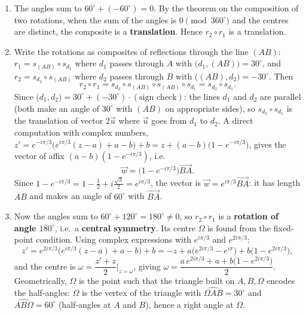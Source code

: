 \documentclass[11pt]{article}
\begin{document}
\begin{corrige}
\begin{enumerate}
\item The angles sum to $60^{\circ} + (-60^{\circ}) = 0$. By the theorem on the composition of two rotations, when the sum of the angles is $0 \pmod{360^{\circ}}$ and the centres are distinct, the composite is a \textbf{translation}. Hence $r_2 \circ r_1$ is a translation.
\item Write the rotations as composites of reflections through the line $(AB)$: $r_1 = s_{(AB)} \circ s_{d_1}$ where $d_1$ passes through $A$ with $\big(d_1,(AB)\big) = 30^{\circ}$, and $r_2 = s_{d_2} \circ s_{(AB)}$ where $d_2$ passes through $B$ with $\big((AB),d_2\big) = -30^{\circ}$. Then
\[ r_2 \circ r_1 = s_{d_2} \circ s_{(AB)} \circ s_{(AB)} \circ s_{d_1} = s_{d_2} \circ s_{d_1}. \]
Since $\big(d_1,d_2\big) = 30^{\circ} + (-30^{\circ})\cdot(\text{sign check})$: the lines $d_1$ and $d_2$ are parallel (both make an angle of $30^{\circ}$ with $(AB)$ on appropriate sides), so $s_{d_2}\circ s_{d_1}$ is the translation of vector $2\vec{u}$ where $\vec{u}$ goes from $d_1$ to $d_2$. A direct computation with complex numbers, $z' = e^{-i\pi/3}\big(e^{i\pi/3}(z-a)+a - b\big) + b = z + (a-b)\big(1 - e^{-i\pi/3}\big)$, gives the vector of affix $(a-b)\left(1 - e^{-i\pi/3}\right)$, i.e.
\[ \vec{w} = \big(1 - e^{-i\pi/3}\big)\overrightarrow{BA}. \]
Since $1 - e^{-i\pi/3} = 1 - \tfrac12 + i\tfrac{\sqrt3}{2} = e^{i\pi/3}$, the vector is $\vec{w} = e^{i\pi/3}\overrightarrow{BA}$: it has length $AB$ and makes an angle of $60^{\circ}$ with $\overrightarrow{BA}$.
\item Now the angles sum to $60^{\circ} + 120^{\circ} = 180^{\circ} \neq 0$, so $r_2 \circ r_1$ is a \textbf{rotation of angle $180^{\circ}$}, i.e.\ a \textbf{central symmetry}. Its centre $\Omega$ is found from the fixed-point condition. Using complex expressions with $e^{i\pi/3}$ and $e^{2i\pi/3}$:
\[ z' = e^{2i\pi/3}\big(e^{i\pi/3}(z-a) + a - b\big) + b = -z + a\big(e^{2i\pi/3} - e^{i\pi}\big) + b\big(1 - e^{2i\pi/3}\big), \]
and the centre is $\omega = \dfrac{z'+z}{2}\Big|_{z=\omega}$, giving $\omega = \dfrac{a\,e^{2i\pi/3} + a + b\big(1 - e^{2i\pi/3}\big)}{2}$. Geometrically, $\Omega$ is the point such that the triangle built on $A, B, \Omega$ encodes the half-angles: $\Omega$ is the vertex of the triangle with $\widehat{\Omega A B} = 30^{\circ}$ and $\widehat{AB\Omega} = 60^{\circ}$ (half-angles at $A$ and $B$), hence a right angle at $\Omega$.
\end{enumerate}
\end{corrige}
\end{document}
